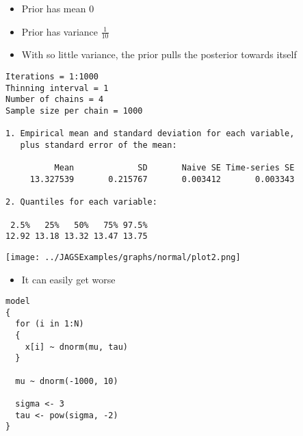 \documentclass{beamer}
\begin{document}
\begin{frame}[fragile]
  \begin{itemize}
    \item{Prior has mean $0$}
    \item{Prior has variance $\frac{1}{10}$}
    \item{With so little variance, the prior pulls the posterior towards itself}
  \end{itemize}
\end{frame}

\begin{frame}[fragile]
  \begin{verbatim}
Iterations = 1:1000
Thinning interval = 1 
Number of chains = 4 
Sample size per chain = 1000 

1. Empirical mean and standard deviation for each variable,
   plus standard error of the mean:

          Mean             SD       Naive SE Time-series SE 
     13.327539       0.215767       0.003412       0.003343 

2. Quantiles for each variable:

 2.5%   25%   50%   75% 97.5% 
12.92 13.18 13.32 13.47 13.75 
  \end{verbatim}
\end{frame}

\begin{frame}[fragile]
  \begin{center}
    \texttt{[image: ../JAGSExamples/graphs/normal/plot2.png]}
  \end{center}
\end{frame}

\begin{frame}
  \begin{itemize}
    \item{It can easily get worse}
  \end{itemize}
\end{frame}

\begin{frame}[fragile]
  \begin{verbatim}
model
{
  for (i in 1:N)
  {
    x[i] ~ dnorm(mu, tau)
  }
  
  mu ~ dnorm(-1000, 10)
  
  sigma <- 3
  tau <- pow(sigma, -2)
}
  \end{verbatim}
\end{frame}
\end{document}
